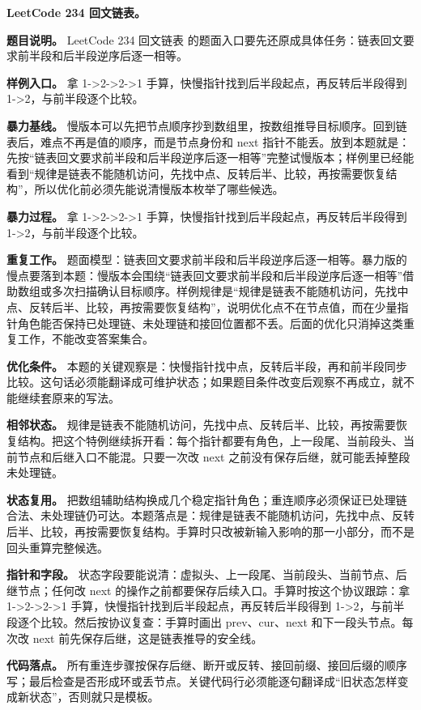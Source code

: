 \noindent\textbf{LeetCode 234 回文链表。}

\textbf{题目说明。} LeetCode 234 回文链表 的题面入口要先还原成具体任务：链表回文要求前半段和后半段逆序后逐一相等。

\textbf{样例入口。} 拿 1->2->2->1 手算，快慢指针找到后半段起点，再反转后半段得到 1->2，与前半段逐个比较。

\textbf{暴力基线。} 慢版本可以先把节点顺序抄到数组里，按数组推导目标顺序。回到链表后，难点不再是值的顺序，而是节点身份和 next 指针不能丢。放到本题就是：先按“链表回文要求前半段和后半段逆序后逐一相等”完整试慢版本；样例里已经能看到“规律是链表不能随机访问，先找中点、反转后半、比较，再按需要恢复结构”，所以优化前必须先能说清慢版本枚举了哪些候选。

\textbf{暴力过程。} 拿 1->2->2->1 手算，快慢指针找到后半段起点，再反转后半段得到 1->2，与前半段逐个比较。

\textbf{重复工作。} 题面模型：链表回文要求前半段和后半段逆序后逐一相等。暴力版的慢点要落到本题：慢版本会围绕“链表回文要求前半段和后半段逆序后逐一相等”借助数组或多次扫描确认目标顺序。样例规律是“规律是链表不能随机访问，先找中点、反转后半、比较，再按需要恢复结构”，说明优化点不在节点值，而在少量指针角色能否保持已处理链、未处理链和接回位置都不丢。后面的优化只消掉这类重复工作，不能改变答案集合。

\textbf{优化条件。} 本题的关键观察是：快慢指针找中点，反转后半段，再和前半段同步比较。这句话必须能翻译成可维护状态；如果题目条件改变后观察不再成立，就不能继续套原来的写法。

\textbf{相邻状态。} 规律是链表不能随机访问，先找中点、反转后半、比较，再按需要恢复结构。把这个特例继续拆开看：每个指针都要有角色，上一段尾、当前段头、当前节点和后继入口不能混。只要一次改 next 之前没有保存后继，就可能丢掉整段未处理链。

\textbf{状态复用。} 把数组辅助结构换成几个稳定指针角色；重连顺序必须保证已处理链合法、未处理链仍可达。本题落点是：规律是链表不能随机访问，先找中点、反转后半、比较，再按需要恢复结构。手算时只改被新输入影响的那一小部分，而不是回头重算完整候选。

\textbf{指针和字段。} 状态字段要能说清：虚拟头、上一段尾、当前段头、当前节点、后继节点；任何改 next 的操作之前都要保存后续入口。手算时按这个协议跟踪：拿 1->2->2->1 手算，快慢指针找到后半段起点，再反转后半段得到 1->2，与前半段逐个比较。然后按协议复查：手算时画出 prev、cur、next 和下一段头节点。每次改 next 前先保存后继，这是链表推导的安全线。

\textbf{代码落点。} 所有重连步骤按保存后继、断开或反转、接回前缀、接回后缀的顺序写；最后检查是否形成环或丢节点。关键代码行必须能逐句翻译成“旧状态怎样变成新状态”，否则就只是模板。

